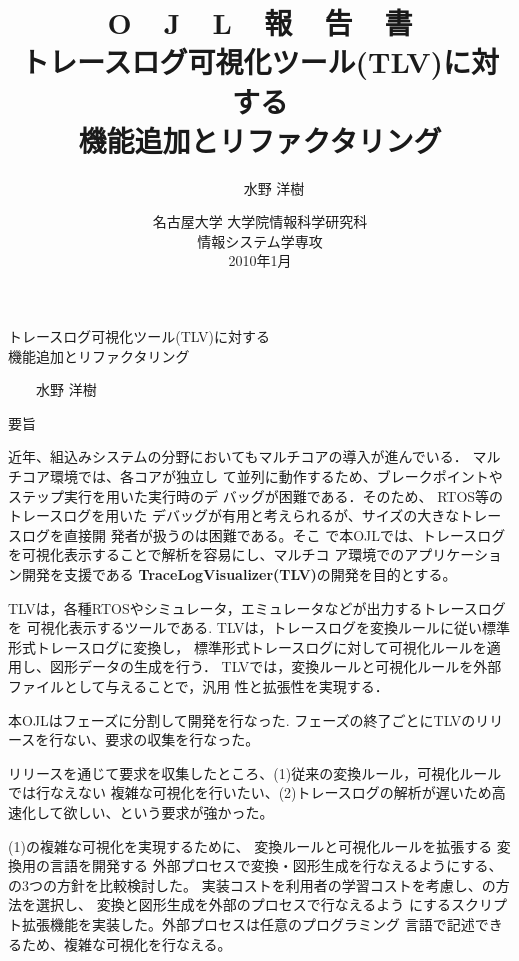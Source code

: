 \documentclass[final,12pt,report]{jsbook}
\title{
{\LARGE\sffamily\gtfamily
O\ \ J\ \ L\ \ 報\ \ 告\ \ 書\\
}
\vspace*{.6in}
{\huge\sffamily\gtfamily
トレースログ可視化ツール(TLV)に対する\\
機能追加とリファクタリング\\
}
\vfill\vfill\vfill
}
\author{
\LARGE\sffamily\gtfamily
350802246\ \ \ \ 水野 洋樹\\
}
\date{
\vfill
\Large\sffamily\gtfamily
名古屋大学 大学院情報科学研究科\\[.2in]
情報システム学専攻\\[.2in]
2010年1月
\vfill
}
\begin{document}
\pagestyle{empty}
\vspace*{-1in}
\begin{center}
\Large\sffamily\gtfamily
トレースログ可視化ツール(TLV)に対する\\
機能追加とリファクタリング
\end{center}
\begin{flushright}
\large\sffamily{}\ \ \ \ 水野 洋樹
\end{flushright}
\begin{center}
\large\sffamily\gtfamily 要旨
\end{center}

近年、組込みシステムの分野においてもマルチコアの導入が進んでいる．
マルチコア環境では、各コアが独立し
て並列に動作するため、ブレークポイントやステップ実行を用いた実行時のデ
バッグが困難である．そのため、 RTOS等のトレースログを用いた
デバッグが有用と考えられるが、サイズの大きなトレースログを直接開
発者が扱うのは困難である。そこ
で本OJLでは、トレースログを可視化表示することで解析を容易にし、マルチコ
ア環境でのアプリケーション開発を支援である
\textbf{TraceLogVisualizer(TLV)}の開発を目的とする。

TLVは，各種RTOSやシミュレータ，エミュレータなどが出力するトレースログを
可視化表示するツールである. TLVは，トレースログを変換ルールに従い標準形式トレースログに変換し，
標準形式トレースログに対して可視化ルールを適用し、図形データの生成を行う．
TLVでは，変換ルールと可視化ルールを外部ファイルとして与えることで，汎用
性と拡張性を実現する．

本OJLはフェーズに分割して開発を行なった.
フェーズの終了ごとにTLVのリリースを行ない、要求の収集を行なった。


リリースを通じて要求を収集したところ、(1)従来の変換ルール，可視化ルールでは行なえない
複雑な可視化を行いたい、(2)トレースログの解析が遅いため高速化して欲しい、という要求が強かった。

(1)の複雑な可視化を実現するために、
変換ルールと可視化ルールを拡張する
変換用の言語を開発する
外部プロセスで変換・図形生成を行なえるようにする、
の3つの方針を比較検討した。
実装コストを利用者の学習コストを考慮し、の方法を選択し、
変換と図形生成を外部のプロセスで行なえるよう
にするスクリプト拡張機能を実装した。外部プロセスは任意のプログラミング
言語で記述できるため、複雑な可視化を行なえる。
\end{document}
